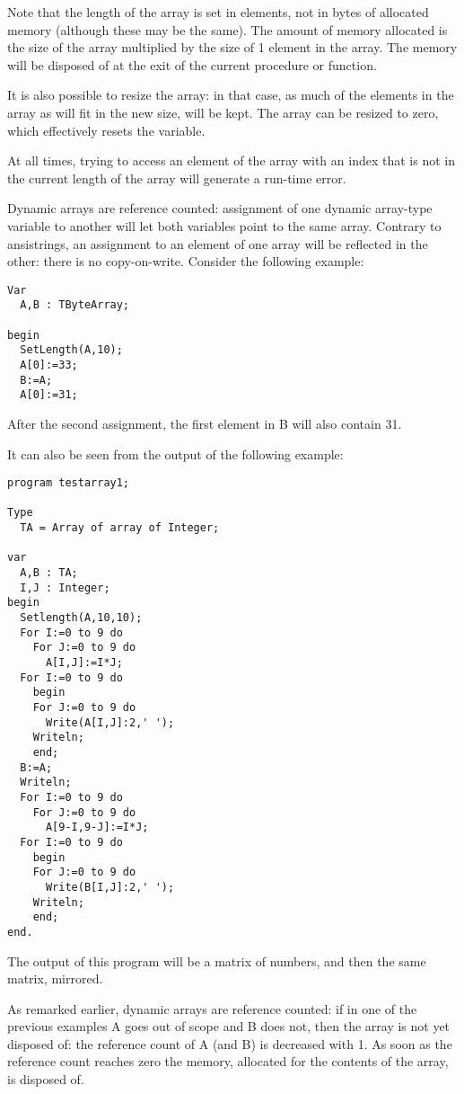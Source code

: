 Note that the length of the array is set in elements, not in bytes of 
allocated memory (although these may be the same). The amount of 
memory allocated is the size of the array multiplied by the size of 
1 element in the array. The memory will be disposed of at the exit of the
current procedure or function. 

It is also possible to resize the array: in that case, as much of the 
elements in the array as will fit in the new size, will be kept. The array
can be resized to zero, which effectively resets the variable.

At all times, trying to access an element of the array with an index 
that is not in the current length of the array will generate a run-time 
error.

Dynamic arrays are reference counted: assignment of one dynamic array-type 
variable to another will let both variables point to the same array. 
Contrary to ansistrings, an assignment to an element of one array will 
be reflected in the other: there is no copy-on-write. Consider the following
example:
\begin{verbatim}
Var
  A,B : TByteArray;

begin
  SetLength(A,10);
  A[0]:=33;
  B:=A;
  A[0]:=31;
\end{verbatim}
After the second assignment, the first element in B will also contain 31.

It can also be seen from the output of the following example:
\begin{verbatim}
program testarray1;

Type
  TA = Array of array of Integer;
  
var   
  A,B : TA;
  I,J : Integer;
begin
  Setlength(A,10,10);
  For I:=0 to 9 do
    For J:=0 to 9 do 
      A[I,J]:=I*J;
  For I:=0 to 9 do
    begin
    For J:=0 to 9 do 
      Write(A[I,J]:2,' ');
    Writeln;
    end;
  B:=A;
  Writeln;
  For I:=0 to 9 do
    For J:=0 to 9 do 
      A[9-I,9-J]:=I*J;
  For I:=0 to 9 do
    begin
    For J:=0 to 9 do 
      Write(B[I,J]:2,' ');
    Writeln;
    end;
end.  
\end{verbatim}
The output of this program will be a matrix of numbers, and then the same matrix, mirrored.

As remarked earlier, dynamic arrays are reference counted: if in one of the previous examples A
goes out of  scope and B does not, then the array is not yet disposed of: the
reference count of A (and B) is decreased with 1. As soon as the reference
count reaches zero the memory, allocated for the contents of the array, is disposed of.

